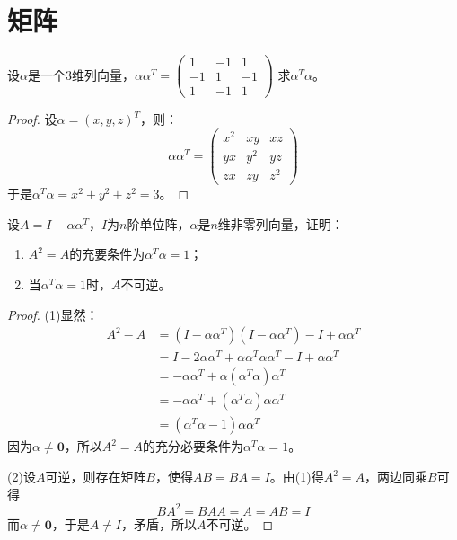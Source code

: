 \chapter{矩阵}

\begin{theorem}
	设$\alpha$是一个$3$维列向量，$\alpha\alpha^T=
	\begin{pmatrix}
		1 & -1 & 1 \\
		-1 & 1 & -1 \\
		1 & -1 & 1
	\end{pmatrix}$
	求$\alpha^T\alpha$。
\end{theorem}
\begin{proof}
	设$\alpha=(x,y,z)^T$，则：
	\begin{equation*}
		\alpha\alpha^T=
		\begin{pmatrix}
			x^2 & xy & xz \\
			yx & y^2 & yz \\
			zx & zy & z^2
		\end{pmatrix}
	\end{equation*}
	于是$\alpha^T\alpha=x^2+y^2+z^2=3$。
\end{proof}
\begin{theorem}
	设$A=I-\alpha\alpha^T$，$I$为$n$阶单位阵，$\alpha$是$n$维非零列向量，证明：
	\begin{enumerate}
		\item $A^2=A$的充要条件为$\alpha^T\alpha=1$；
		\item 当$\alpha^T\alpha=1$时，$A$不可逆。
	\end{enumerate}
\end{theorem}
\begin{proof}
	(1)显然：
	\begin{align*}
		A^2-A
		&=(I-\alpha\alpha^T)(I-\alpha\alpha^T)-I+\alpha\alpha^T \\
		&=I-2\alpha\alpha^T+\alpha\alpha^T\alpha\alpha^T-I+\alpha\alpha^T \\
		&=-\alpha\alpha^T+\alpha(\alpha^T\alpha)\alpha^T \\
		&=-\alpha\alpha^T+(\alpha^T\alpha)\alpha\alpha^T \\
		&=(\alpha^T\alpha-1)\alpha\alpha^T
	\end{align*}
	因为$\alpha\ne\mathbf{0}$，所以$A^2=A$的充分必要条件为$\alpha^T\alpha=1$。\par
	(2)设$A$可逆，则存在矩阵$B$，使得$AB=BA=I$。由(1)得$A^2=A$，两边同乘$B$可得
	\begin{equation*}
		BA^2=BAA=A=AB=I
	\end{equation*}
	而$\alpha\ne\mathbf{0}$，于是$A\ne I$，矛盾，所以$A$不可逆。
\end{proof}
